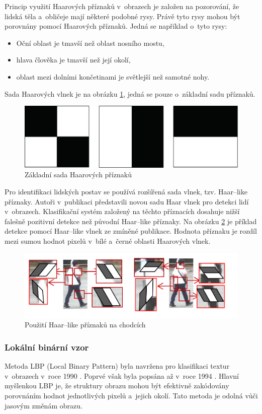 Princip využití Haarových příznaků v~obrazech je založen na pozorování, že lidská těla a~obličeje mají některé podobné rysy. Právě tyto rysy mohou být porovnány pomocí Haarových příznaků. Jedná se například o~tyto rysy:
\begin{itemize}
  \item{Oční oblast je tmavší než oblast nosního mostu,}
  \item{hlava člověka je tmavší než její okolí,}
  \item{oblast mezi dolními končetinami je světlejší než samotné nohy.}
\end{itemize}
Sada Haarových vlnek je na obrázku \ref{fig:basichaarfeatures}, jedná se pouze o~základní sadu příznaků.
\begin{figure}[H]
\centering
\includegraphics[width=.7\linewidth]{figures/haar_features}
\caption{Základní sada Haarových příznaků}
\label{fig:basichaarfeatures}
\end{figure}

Pro identifikaci lidských postav se používá rozšířená sada vlnek, tzv. Haar--like příznaky. Autoři v~publikaci \cite{haar:like} představili novou sadu Haar vlnek pro detekci lidí v~obrazech. Klasifikační systém založený na těchto příznacích dosahuje nižší falešně pozitivní detekce než původní Haar--like příznaky. Na obrázku \ref{fig:haarlike} je příklad detekce pomocí Haar--like vlnek ze zmíněné publikace. Hodnota příznaku je rozdíl mezi sumou hodnot pixelů v~bílé a~černé oblasti Haarových vlnek.
\begin{figure}[H]
\centering
\includegraphics[width=.8\linewidth]{figures/haar-like}
\caption{Použití Haar--like příznaků na chodcích \cite{haar:like}}
\label{fig:haarlike}
\end{figure}

\subsubsection*{Lokální binární vzor}
Metoda LBP (Local Binary Pattern) byla navržena pro klasifikaci textur v~obrazech v~roce 1990 \cite{lbp:texture}. Poprvé však byla popsána až v~roce 1994 \cite{lbp:first}. Hlavní myšlenkou LBP je, že struktury obrazu mohou být efektivně zakódovány porovnáním hodnot jednotlivých pixelů a~jejich okolí. Tato metoda je odolná vůči jasovým změnám obrazu.

